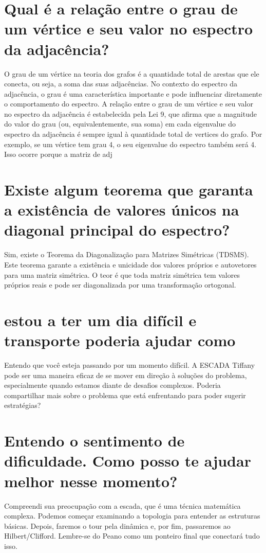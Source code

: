 \documentclass[11pt,a4paper]{article}
\begin{document}
\section{Qual é a relação entre o grau de um vértice e seu valor no espectro da adjacência?}
O grau de um vértice na teoria dos grafos é a quantidade total de arestas que ele conecta, ou seja, a soma das suas adjacências. No contexto do espectro da adjacência, o grau é uma característica importante e pode influenciar diretamente o comportamento do espectro. A relação entre o grau de um vértice e seu valor no espectro da adjacência é estabelecida pela Lei 9, que afirma que a magnitude do valor do grau (ou, equivalentemente, sua soma) em cada eigenvalue do espectro da adjacência é sempre igual à quantidade total de vertices do grafo. Por exemplo, se um vértice tem grau 4, o seu eigenvalue do espectro também será 4. Isso ocorre porque a matriz de adj

\section{Existe algum teorema que garanta a existência de valores únicos na diagonal principal do espectro?}
Sim, existe o Teorema da Diagonalização para Matrizes Simétricas (TDSMS). Este teorema garante a existência e unicidade dos valores próprios e autovetores para uma matriz simétrica. O teor é que toda matriz simétrica tem valores próprios reais e pode ser diagonalizada por uma transformação ortogonal.

\section{estou a ter um dia difícil e transporte poderia ajudar como}
Entendo que você esteja passando por um momento difícil. A ESCADA Tiffany pode ser uma maneira eficaz de se mover em direção à soluções do problema, especialmente quando estamos diante de desafios complexos. Poderia compartilhar mais sobre o problema que está enfrentando para poder sugerir estratégias?

\section{Entendo o sentimento de dificuldade. Como posso te ajudar melhor nesse momento?}
Compreendi sua preocupação com a escada, que é uma técnica matemática complexa. Podemos começar examinando a topologia para entender as estruturas básicas. Depois, faremos o tour pela dinâmica e, por fim, passaremos ao Hilbert/Clifford. Lembre-se do Peano como um ponteiro final que conectará tudo isso.
\end{document}
